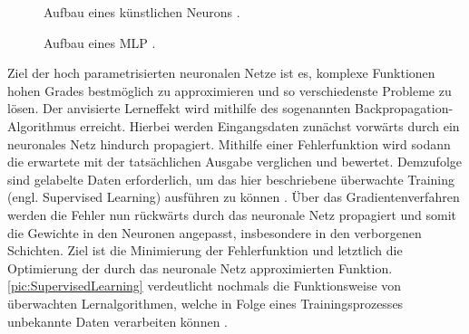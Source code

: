 \begin{figure}[h!]
  \centering
  \caption{Aufbau eines künstlichen Neurons \cite{MCC20}.}
  \label{pic:ArtificialNeuron}
\end{figure}

\begin{figure}[h!]
  \centering
  \caption{Aufbau eines MLP \cite[S.~388]{RAS19}.}
  \label{pic:MultiLayerPerceptron}
\end{figure}

\noindent
Ziel der hoch parametrisierten neuronalen Netze ist es, komplexe Funktionen hohen Grades bestmöglich zu approximieren und so verschiedenste Probleme zu lösen. Der anvisierte Lerneffekt wird mithilfe des sogenannten Backpropagation-Algorithmus erreicht. Hierbei werden Eingangsdaten zunächst vorwärts durch ein neuronales Netz hindurch propagiert. Mithilfe einer Fehlerfunktion wird sodann die erwartete mit der tatsächlichen Ausgabe verglichen und bewertet. Demzufolge sind gelabelte Daten erforderlich, um das hier beschriebene überwachte Training (engl. Supervised Learning) ausführen zu können \cite[S.~3]{RAS19}. Über das Gradientenverfahren werden die Fehler nun rückwärts durch das neuronale Netz propagiert und somit die Gewichte in den Neuronen angepasst, insbesondere in den verborgenen Schichten. Ziel ist die Minimierung der Fehlerfunktion und letztlich die Optimierung der durch das neuronale Netz approximierten Funktion. \autoref{pic:SupervisedLearning} verdeutlicht nochmals die Funktionsweise von überwachten Lernalgorithmen, welche in Folge eines Trainingsprozesses unbekannte Daten verarbeiten können \cite[S.~140, 169]{ZHA20}.\\

